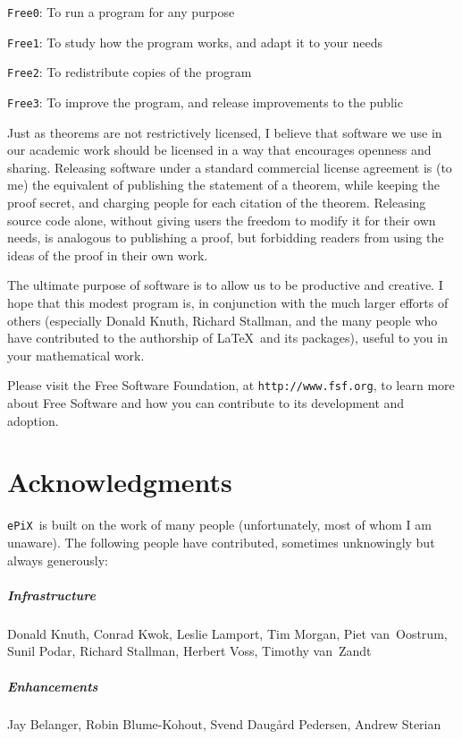 \documentclass[12pt]{report}
\newcommand{\code}[1]{\texttt{#1}}
\newcommand{\ePiX}{\code{ePiX}}
\begin{document}
\code{Free0}: To run a program for any purpose

\code{Free1}: To study how the program works, and adapt it to your needs

\code{Free2}: To redistribute copies of the program

\code{Free3}: To improve the program, and release improvements to the
public

Just as theorems are not restrictively licensed, I believe that
software we use in our academic work should be licensed in a way that
encourages openness and sharing. Releasing software under a standard
commercial license agreement is (to me) the equivalent of publishing
the statement of a theorem, while keeping the proof secret, and
charging people for each citation of the theorem. Releasing source
code alone, without giving users the freedom to modify it for their
own needs, is analogous to publishing a proof, but forbidding
readers from using the ideas of the proof in their own work.

The ultimate purpose of software is to allow us to be productive and
creative. I hope that this modest program is, in conjunction with the
much larger efforts of others (especially Donald Knuth, Richard
Stallman, and the many people who have contributed to the authorship
of \LaTeX\ and its packages), useful to you in your mathematical work.

Please visit the Free Software Foundation, at
\verb+http://www.fsf.org+, to learn more about Free Software and how
you can contribute to its development and adoption.

\chapter{Acknowledgments}

\ePiX\ is built on the work of many people (unfortunately, most of
whom I am unaware). The following people have contributed, sometimes
unknowingly but always generously: 

\paragraph{Infrastructure} Donald Knuth, Conrad Kwok, Leslie Lamport,
Tim Morgan, Piet van~Oostrum, Sunil Podar, Richard Stallman, Herbert
Voss, Timothy van~Zandt

\paragraph{Enhancements} Jay Belanger, Robin Blume-Kohout, Svend
Daug{\aa}rd Pedersen, Andrew Sterian
\end{document}
